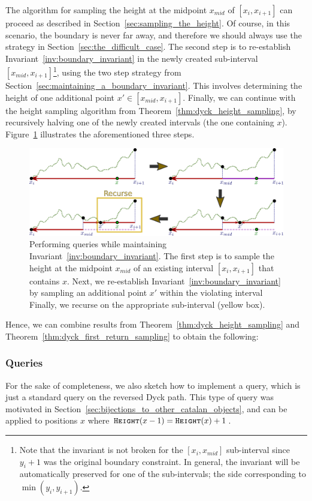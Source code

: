The algorithm for sampling the height at the midpoint $x_{mid}$ of $[x_i,x_{i+1}]$ can proceed as described in Section~\ref{sec:sampling_the_height}.
Of course, in this scenario, the boundary is never far away, and therefore we should always use the strategy in Section~\ref{sec:the_difficult_case}.
The second step is to re-establish Invariant~\ref{inv:boundary_invariant} in the newly created sub-interval $[x_{mid},x_{i+1}]$\footnote{
Note that the invariant is not broken for the $[x_i,x_{mid}]$ sub-interval since $y_i+1$ was the original boundary constraint.
In general, the invariant will be automatically preserved for one of the sub-intervals; the side corresponding to $\min(y_i,y_{i+1})$.},
using the two step strategy from Section~\ref{sec:maintaining_a_boundary_invariant}.
This involves determining the height of one additional point $x'\in [x_{mid},x_{i+1}]$.
Finally, we can continue with the height sampling algorithm from Theorem~\ref{thm:dyck_height_sampling},
by recursively halving one of the newly created intervals (the one containing $x$).
Figure~\ref{fig:dyck_invariant_height_queries} illustrates the aforementioned three steps.
\begin{figure}[htpb]
    \centering
    \includegraphics[width=\textwidth]{images/dyck_invariant_height_queries.pdf}
    \caption{Performing  queries while maintaining Invariant~\ref{inv:boundary_invariant}.
    The first step is to sample the height at the midpoint $x_{mid}$ of an existing interval $[x_i,x_{i+1}]$ that contains $x$.
    Next, we re-establish Invariant~\ref{inv:boundary_invariant} by sampling an additional point $x'$ within the violating interval
    Finally, we recurse on the appropriate sub-interval (yellow box).
    }
    \label{fig:dyck_invariant_height_queries}
\end{figure}

Hence, we can combine results from Theorem~\ref{thm:dyck_height_sampling} and Theorem~\ref{thm:dyck_first_return_sampling} to obtain the following:
\CatalanGrand*


\subsubsection{ Queries}
\label{sec:reverse_first_return_queries}
For the sake of completeness, we also sketch how to implement a  query,
which is just a standard  query on the reversed Dyck path.
This type of query was motivated in Section~\ref{sec:bijections_to_other_catalan_objects},
and can be applied to positions $x$ where $\texttt{\textsc{Height}}(x-1) = \texttt{\textsc{Height}}(x)+1$.

